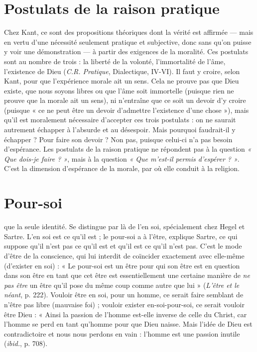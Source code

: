 \section{Postulats de la raison pratique}
Chez Kant, ce sont des propositions
théoriques dont la vérité
est affirmée — mais en vertu d’une nécessité seulement pratique et subjective,
donc sans qu’on puisse y voir une démonstration — à partir des exigences
de la moralité. Ces postulats sont au nombre de trois : la liberté de la volonté,
l’immortalité de l’âme, l'existence de Dieu ({\it C.R. Pratique}, Dialectique, IV-VI).
Il faut y croire, selon Kant, pour que l’expérience morale ait un sens. Cela ne
prouve pas que Dieu existe, que nous soyons libres ou que l'âme soit immortelle
(puisque rien ne prouve que la morale ait un sens), ni n’entraîne que ce
soit un devoir d’y croire (puisque « ce ne peut être un devoir d’admettre l’existence
d’une chose »), mais qu’il est moralement nécessaire d’accepter ces trois
postulats : on ne saurait autrement échapper à l'absurde et au désespoir. Mais
pourquoi faudrait-il y échapper ? Pour faire son devoir ? Non pas, puisque
celui-ci n’a pas besoin d’espérance. Les postulats de la raison pratique ne répondent
pas à la question {\it « Que dois-je faire ? »}, mais à la question {\it « Que m'est-il
permis d'espérer ? »}. C’est la dimension d’espérance de la morale, par où elle
conduit à la religion.

\section{Pour-soi}
que la seule identité. Se distingue par là de l'en soi, spécialement
chez Hegel et Sartre. L’en soi est ce qu’il est ; le pour-soi a à l’être,
explique Sartre, ce qui suppose qu’il n’est pas ce qu’il est et qu’il est ce qu’il
n’est pas. C’est le mode d’être de la conscience, qui lui interdit de coïncider
exactement avec elle-même (d’exister en soi) : « Le pour-soi est un être pour qui
son être est en question dans son être en tant que cet être est essentiellement
une certaine manière de {\it ne pas être} un être qu’il pose du même coup comme
autre que lui » ({\it L'être et le néant}, p. 222). Vouloir être en soi, pour un homme,
ce serait faire semblant de n’être pas libre (mauvaise foi) ; vouloir exister en-soi-pour-soi,
ce serait vouloir être Dieu : « Ainsi la passion de l’homme est-elle
inverse de celle du Christ, car l’homme se perd en tant qu'homme pour que
Dieu naisse. Mais l’idée de Dieu est contradictoire et nous nous perdons en
vain : l’homme est une passion inutile ({\it ibid.}, p. 708).

